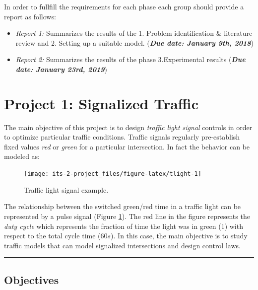 \documentclass[]{book}
\theoremstyle{definition}
\theoremstyle{definition}
\theoremstyle{definition}
\theoremstyle{remark}
\begin{document}
In order to fullfill the requirements for each phase each group should
provide a report as follows:

\begin{itemize}
\item
  \emph{Report 1:} Summarizes the results of the 1. Problem
  identification \& literature review and 2. Setting up a suitable
  model. (\textbf{\emph{Due date: January 9th, 2018}})
\item
  \emph{Report 2:} Summarizes the results of the phase 3.Experimental
  results (\textbf{\emph{Due date: January 23rd, 2019}})
\end{itemize}

\hypertarget{project-1-signalized-traffic}{%
\chapter*{Project 1: Signalized
Traffic}\label{project-1-signalized-traffic}}

The main objective of this project is to design \emph{traffic light
signal} controls in order to optimize particular traffic conditions.
Traffic signals regularly pre-establish fixed values \emph{red} or
\emph{green} for a particular intersection. In fact the behavior can be
modeled as:



\begin{figure}

{\centering \texttt{[image: its-2-project\_files/figure-latex/tlight-1]} 

}

\caption{Traffic light signal example.}\label{fig:tlight}
\end{figure}

The relationship between the switched green/red time in a traffic light
can be represented by a pulse signal (Figure \ref{fig:tlight}). The red
line in the figure represents the \emph{duty cycle} which represents the
fraction of time the light was in green (\(1\)) with respect to the
total cycle time (\(60s\)). In this case, the main objective is to study
traffic models that can model signalized intersections and design
control laws.

\begin{center}\rule{0.5\linewidth}{\linethickness}\end{center}

\hypertarget{objectives}{%
\section*{Objectives}\label{objectives}}
\end{document}

